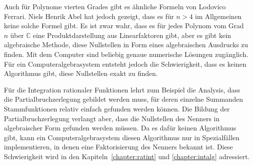 Auch für Polynome vierten Grades gibt es ähnliche Formeln 
%
von Lodovico Ferrari.
%
Niels Henrik Abel hat jedoch gezeigt, dass es für $n>4$ im
%
Allgemeinen keine solche Formel gibt.
Es ist zwar wahr, dass es für jedes Polynom vom Grad $n$
über $\mathbb{C}$ eine Produktdarstellung aus Linearfaktoren
gibt, aber es gibt kein algebraische Methode, diese Nullstellen in
Form eines algebraischen Ausdrucks zu finden.
Mit dem Computer sind beliebig genaue numerische Lösungen
zugänglich.
Für ein Computeralgebrasystem entsteht jedoch die Schwierigkeit,
dass es keinen Algorithmus gibt, diese Nullstellen exakt zu finden.

Für die Integration rationaler Funktionen lehrt zum Beispiel die Analysis,
dass die Partialbruchzerlegung gebildet werden muss, für deren einzelne
%
Summanden Stammfunktionen relativ einfach gefunden werden können.
Die Bildung der Partialbruchzerlegung verlangt aber, dass die
Nullstellen des Nenners in algebraischer Form gefunden werden
müssen.
Da es dafür keinen Algorithmus gibt, kann ein Computeralgebrasystem
diesen Algorithmus nur in Spezialfällen implementieren, in denen
eine Faktorisierung des Nenners bekannt ist.
Diese Schwierigkeit wird in den Kapiteln~\ref{chapter:ratint}
und \ref{chapter:intalg} adressiert.


